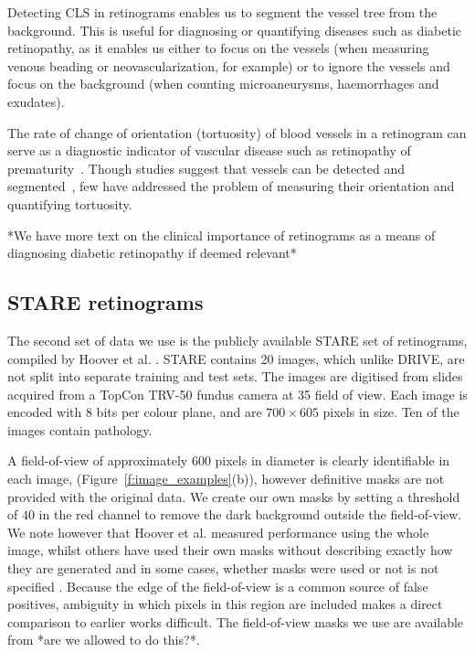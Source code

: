 \documentclass{IEEEtran}
\newcommand{\fref}[1]{Figure~\ref{#1}}
\def\by{\ensuremath{\times}}
\begin{document}
Detecting CLS in retinograms enables us to segment the vessel tree from the background. This is useful for diagnosing or quantifying diseases such as diabetic retinopathy, as it enables us either to focus on the vessels (when measuring venous beading or neovascularization, for example) or to ignore the vessels and focus on the background (when counting microaneurysms, haemorrhages and exudates).

The rate of change of orientation (tortuosity) of blood vessels in a retinogram can serve as a diagnostic indicator of vascular disease such as retinopathy of prematurity~\cite{Wallace_TAOS07,Hart_etal_IJMI99}. Though studies suggest that vessels can be detected and segmented~\cite{Staal_etal_TMI04,Ricci_Perfetti_TMI07}, few have addressed the problem of measuring their orientation and quantifying tortuosity.

*We have more text on the clinical importance of retinograms as a means of diagnosing diabetic retinopathy if deemed relevant*

\subsection{STARE retinograms}
\label{s:dataset_stare}
The second set of data we use is the publicly available STARE set of retinograms, compiled by Hoover et al. \cite{Hoover_etal_TMI00}. STARE contains 20 images, which unlike DRIVE, are not split into separate training and test sets. The images are digitised from slides acquired from a TopCon TRV-50 fundus camera at 35 field of view. Each image is encoded with 8 bits per colour plane, and are $700 \by 605$ pixels in size. Ten of the images contain pathology.

A field-of-view of approximately 600 pixels in diameter is clearly identifiable in each image, (\fref{f:image_examples}(b)), however definitive masks are not provided with the original data. We create our own masks by setting a threshold of $40$ in the red channel to remove the dark background outside the field-of-view. We note however that Hoover et al. measured performance using the whole image, whilst others have used their own masks without describing exactly how they are generated \cite{Staal_etal_TMI04} and in some cases, whether masks were used or not is not specified \cite{}. Because the edge of the field-of-view is a common source of false positives, ambiguity in which pixels in this region are included makes a direct comparison to earlier works difficult. The field-of-view masks we use are available from *are we allowed to do this?*.
\end{document}
